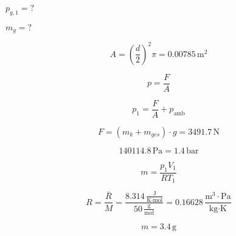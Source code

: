 

\item[a)] $p_{g,1} = ?$
    \item[] $m_g = ?$
    \item[] \[
    A = \left(\frac{d}{2}\right)^2 \pi = 0.00785 \, \text{m}^2
    \]
    \item[] \[
    p = \frac{F}{A}
    \]
    \item[] \[
    p_1 = \frac{F}{A} + p_{\text{amb}}
    \]
    \item[] \[
    F = (m_k + m_{ges}) \cdot g = 3491.7 \, \text{N}
    \]
    \item[] \[
    140114.8 \, \text{Pa} = 1.4 \, \text{bar}
    \]
    \item[] \[
    m = \frac{p_1 V_1}{R T_1}
    \]
    \item[] \[
    R = \frac{\bar{R}}{M} = \frac{8.314 \, \frac{\text{J}}{\text{K} \cdot \text{mol}}}{50 \, \frac{\text{g}}{\text{mol}}} = 0.16628 \, \frac{\text{m}^3 \cdot \text{Pa}}{\text{kg} \cdot \text{K}}
    \]
    \item[] \[
    m = 3.4 \, \text{g}
    \]